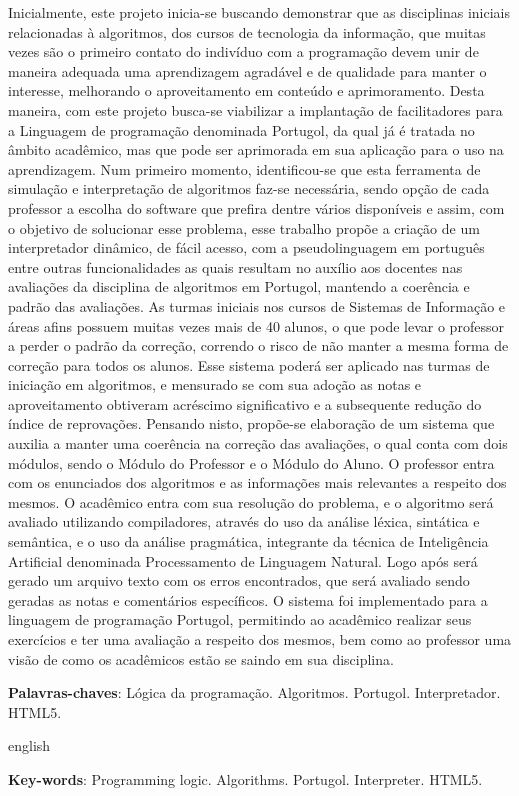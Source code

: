 

\setlength{\absparsep}{18pt} %
\begin{resumo}
Inicialmente, este projeto inicia-se buscando demonstrar que as disciplinas
iniciais relacionadas à algoritmos, dos cursos de tecnologia da informação, que
muitas vezes são o primeiro contato do indivíduo com a programação devem unir de
maneira adequada uma aprendizagem agradável e de qualidade para manter o
interesse, melhorando o aproveitamento em conteúdo e aprimoramento. Desta
maneira, com este projeto busca-se viabilizar a implantação de facilitadores
para a Linguagem de programação denominada Portugol, da qual já é tratada no
âmbito acadêmico, mas que pode ser aprimorada em sua aplicação para o uso na
aprendizagem. Num primeiro momento, identificou-se que esta ferramenta de
simulação e interpretação de algoritmos faz-se necessária, sendo opção de cada
professor a escolha do software que prefira dentre vários disponíveis e assim,
com o objetivo de solucionar esse problema, esse trabalho propõe a criação de
um interpretador dinâmico, de fácil acesso, com a pseudolinguagem em português
entre outras funcionalidades as quais resultam no auxílio aos docentes nas
avaliações da disciplina de algoritmos em Portugol, mantendo a coerência e
padrão das avaliações. As turmas iniciais nos cursos de Sistemas de Informação e
áreas afins possuem muitas vezes mais de 40 alunos, o que pode levar o professor
a perder o padrão da correção, correndo o risco de não manter a mesma forma de
correção para todos os alunos. Esse sistema poderá ser aplicado nas turmas de
iniciação em algoritmos, e mensurado se com sua adoção as notas e aproveitamento
obtiveram acréscimo significativo e a subsequente redução do índice de
reprovações. Pensando nisto, propõe-se elaboração de um sistema que auxilia a
manter uma coerência na correção das avaliações, o qual conta com dois módulos,
sendo o Módulo do Professor e o Módulo do Aluno. O professor entra com os
enunciados dos algoritmos e as informações mais relevantes a respeito dos
mesmos. O acadêmico entra com sua resolução do problema, e o algoritmo será
avaliado utilizando compiladores, através do uso da análise léxica, sintática e
semântica, e o uso da análise pragmática, integrante da técnica de Inteligência
Artificial denominada Processamento de Linguagem Natural. Logo após será gerado
um arquivo texto com os erros encontrados, que será avaliado sendo geradas as
notas e comentários específicos. O sistema foi implementado para a linguagem de
programação Portugol, permitindo ao acadêmico realizar seus exercícios e ter uma
avaliação a respeito dos mesmos, bem como ao professor uma visão de como os
acadêmicos estão se saindo em sua disciplina.

\vspace{\onelineskip}
\textbf{Palavras-chaves}: Lógica da programação. Algoritmos. Portugol. Interpretador. HTML5.
\end{resumo}

\begin{resumo}[Abstract]
\begin{otherlanguage*}{english}

\vspace{\onelineskip}
\textbf{Key-words}: Programming logic. Algorithms. Portugol. Interpreter. HTML5.
\end{otherlanguage*}
\end{resumo}
